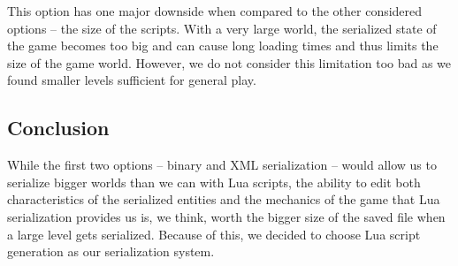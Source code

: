 This option has one major downside when compared to the other considered options -- the size of the scripts. With a very large world,
the serialized state of the game becomes too big and can cause long loading times and thus limits the size of the game world.
However, we do not consider this limitation too bad as we found smaller levels sufficient for general play.

\subsection{Conclusion}

While the first two options -- binary and XML serialization -- would allow us to serialize bigger worlds than we can with Lua scripts,
the ability to edit both characteristics of the serialized entities and the mechanics of the game that Lua serialization provides us
is, we think, worth the bigger size of the saved file when a large level gets serialized. Because of this, we decided to choose Lua script
generation as our serialization system.
